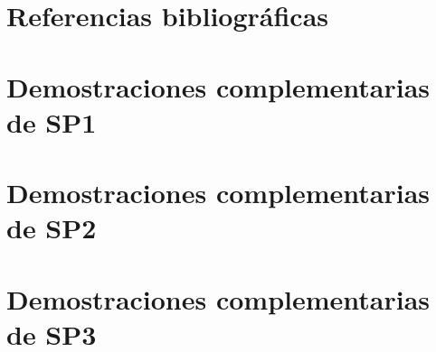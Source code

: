 \documentclass[12pt,a4paper]{article}
\begin{document}






\clearpage
\viuromanfoliofalse
{}
\setcounter{page}{1}

\clearpage

\clearpage

\clearpage

\clearpage

\clearpage

\clearpage


\clearpage
\section{Referencias bibliográficas}
\label{sec:references}
\printbibliography[heading=none]

\clearpage
\appendix


\clearpage
\section{Demostraciones complementarias de SP1}
\label{app:sp1-all-proofs}





\clearpage
\section{Demostraciones complementarias de SP2}
\label{app:sp2-all-proofs}



\clearpage
\section{Demostraciones complementarias de SP3}
\label{app:sp3-all-proofs}


\end{document}
